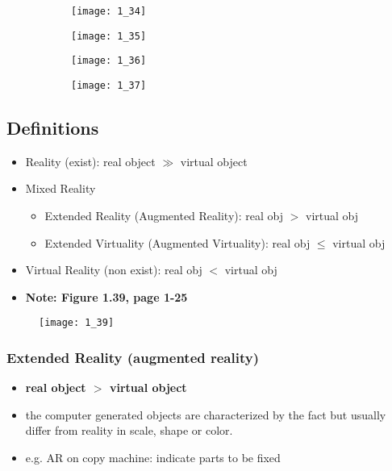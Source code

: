\documentclass{standalone}
\begin{document}
\begin{figure}[H]
	\centering
	\begin{subfigure}[b]{0.45\textwidth}
		\texttt{[image: 1\_34]}
	\end{subfigure}
	\begin{subfigure}[b]{0.45\textwidth}
		\texttt{[image: 1\_35]}
	\end{subfigure}
	\begin{subfigure}[b]{0.45\textwidth}
		\texttt{[image: 1\_36]}
	\end{subfigure}
	\begin{subfigure}[b]{0.45\textwidth}
		\texttt{[image: 1\_37]}
	\end{subfigure}
\end{figure}

\subsection{Definitions}

\begin{itemize}
	\item Reality (exist): real object $\gg$ virtual object
	\item Mixed Reality 
		\begin{itemize}
			\item Extended Reality (Augmented Reality): real obj $>$ virtual obj
			\item Extended Virtuality (Augmented Virtuality): real obj $\leq$ virtual obj
		\end{itemize}
	\item Virtual Reality (non exist): real obj $<$ virtual obj
	\item \textbf{Note: Figure 1.39, page 1-25}
\end{itemize}

\begin{figure}[H]
	\centering
	\texttt{[image: 1\_39]}
\end{figure}

\subsubsection{Extended Reality (augmented reality)}

\begin{itemize}
	\item \textbf{real object $>$ virtual object}
	\item the computer generated objects are characterized by the fact but usually differ from reality in scale, shape or color.
	\item e.g. AR on copy machine: indicate parts to be fixed  
\end{itemize}
\end{document}
